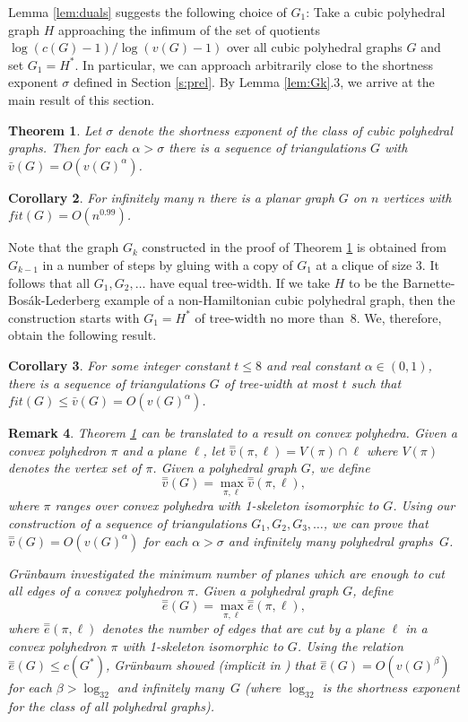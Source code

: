 \documentclass[reqno,12pt]{amsart}
\newcommand{\lin}[1]{\bar v(#1)}
\newcommand{\plin}[1]{\stackrel{=}{v}(#1)}
\newcommand{\pcute}[1]{\stackrel{=}{e}(#1)}
\newcommand{\fit}[1]{\mathit{fit}(#1)}
\newtheorem{theorem}{Theorem}[section]
\newtheorem{corollary}[theorem]{Corollary}
\newtheorem{remark}[theorem]{Remark}
\begin{document}
Lemma \ref{lem:duals} suggests the following choice of $G_1$: Take
a cubic polyhedral graph $H$ approaching the infimum of the set of quotients
$\log(c(G)-1)/\log(v(G)-1)$ over all cubic polyhedral graphs $G$ and set $G_1=H^*$.
In particular, we can approach arbitrarily close to the shortness exponent
$\sigma$ defined in Section \ref{s:prel}. By Lemma \ref{lem:Gk}.3, 
we arrive at the main result of this section.

\begin{theorem}\label{thm:lin}
Let $\sigma$ denote the shortness exponent of the class of cubic polyhedral
graphs. Then for each $\alpha>\sigma$ there is a sequence of triangulations
$G$ with $\lin G=O(v(G)^\alpha)$.
\end{theorem}

\begin{corollary}
For infinitely many $n$ there is a planar graph $G$ on $n$ vertices with $\fit G=O(n^{0.99})$.
\end{corollary}

Note that the graph $G_k$ constructed in the proof of Theorem \ref{thm:lin}
is obtained from $G_{k-1}$ in a number of steps by gluing with a copy of $G_1$
at a clique of size 3. It follows that all $G_1,G_2,\ldots$ have equal tree-width.
If we take $H$ to be the Barnette-Bos\'ak-Lederberg example of a non-Hamiltonian
cubic polyhedral graph, then the construction starts with $G_1=H^*$ of tree-width
no more than~8. We, therefore, obtain the following result.

\begin{corollary}\label{cor:btw}
For some integer constant $t\le8$ and real constant $\alpha\in(0,1)$,
there is a sequence of triangulations $G$ of tree-width at most $t$
such that $\fit G\le\lin G=O(v(G)^\alpha)$.
\end{corollary}

\begin{remark}\rm
Theorem \ref{thm:lin} can be translated to a result on convex polyhedra.
Given a convex polyhedron $\pi$ and a plane $\ell$, let $\plin{\pi,\ell}=V(\pi)\cap\ell$ where
$V(\pi)$ denotes the vertex set of $\pi$. Given a polyhedral graph $G$, we define
$$
\plin G=\max_{\pi,\ell}\plin{\pi,\ell},
$$ 
where $\pi$ ranges over convex polyhedra with 1-skeleton
isomorphic to $G$. Using our construction of a sequence of triangulations $G_1,G_2,G_3,\ldots$,
we can prove that $\plin G=O(v(G)^\alpha)$ for each $\alpha>\sigma$ and infinitely many polyhedral
graphs~$G$.

Gr\"unbaum \cite{Gru} investigated the minimum number of planes which are enough to
cut all edges of a convex polyhedron $\pi$. Given a polyhedral graph $G$, define
$$
\pcute G=\max_{\pi,\ell}\pcute{\pi,\ell},
$$ 
where $\pcute{\pi,\ell}$ denotes the number of edges
that are cut by a plane $\ell$ in a convex polyhedron $\pi$ with 1-skeleton isomorphic
to $G$. Using the relation $\pcute G\le c(G^*)$, Gr\"unbaum showed 
(implicit in \cite[pp.\ 893--894]{Gru}) that $\pcute G=O(v(G)^\beta)$
for each $\beta>\log_32$ and infinitely many~$G$ (where $\log_32$ is the shortness
exponent for the class of all polyhedral graphs).
\end{remark}
\end{document}
